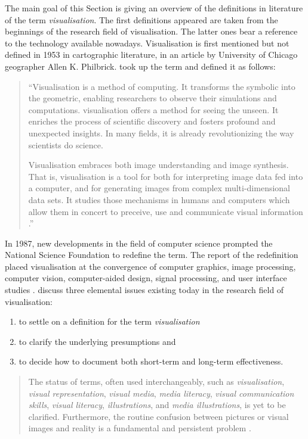 \cbstart
The main goal of this Section is giving an overview of the definitions in literature of the term \textit{visualisation}. The first definitions appeared are taken from the beginnings of the research field of visualisation. The latter ones bear a reference to the technology available nowadays.
\cbend
Visualisation is first mentioned but not defined in 1953 in cartographic literature, in an article by University of Chicago geographer Allen K. Philbrick. \citeauthor{mccormick:1987} took up the term and defined it as follows:
\begin{quote}
 ``Visualisation is a method of computing. It transforms the symbolic into the geometric, enabling researchers to observe their simulations and computations. visualisation offers a method for seeing the unseen. It enriches the process of scientific discovery and fosters profound and unexpected insights. In many fields, it is already revolutionizing the way scientists do science.

 Visualisation embraces both image understanding and image synthesis. That is, visualisation is a tool for both for interpreting image data fed into a computer, and for generating images from complex multi-dimensional data sets. It studies those mechanisms in humans and computers which allow them in concert to preceive, use and communicate visual information .''
\end{quote}

In 1987, new developments in the field of computer science prompted the National Science Foundation to redefine the term. The report of the redefinition placed visualisation at the convergence of computer graphics, image processing, computer vision, computer-aided design, signal processing, and user interface studies . \citeauthor{Phillips2010} discuss three elemental issues existing today in the research field of visualisation:

\begin{enumerate}
\item to settle on a definition for the term \textit{visualisation}
\item to clarify the underlying presumptions and
\item to decide how to document both short-term and long-term effectiveness.
\end{enumerate}

\begin{quote}
The status of terms, often used interchangeably, such as \textit{visualisation}, \textit{visual representation}, \textit{visual media}, \textit{media literacy}, \textit{visual communication skills}, \textit{visual literacy}, \textit{illustrations}, and \textit{media illustrations}, is yet to be clarified. Furthermore, the routine confusion between pictures or visual images and reality is a fundamental and persistent problem .
\end{quote}

